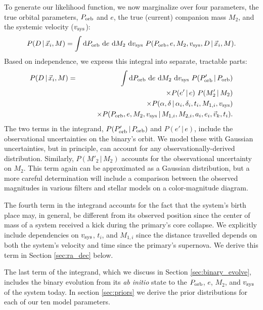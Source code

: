 \documentclass[12pt, preprint]{aastex}
\newcommand{\given}{\,|\,}
\newcommand{\dd}{\mathrm{d}}
\begin{document}
To generate our likelihood function, we now marginalize over four parameters, the true orbital parameters, $P_{\rm orb}$ and $e$, the true (current) companion mass $M_2$, and the systemic velocity ($v_{\rm sys}$):
\begin{equation}
P(D \given \vec{x}_i, M) =  \int \dd P_{\rm orb}\ \dd e\ \dd M_2\ \dd v_{\rm sys}\ P( P_{\rm orb}, e, M_2, v_{\rm sys}, D \given \vec{x}_i, M).
\end{equation}
Based on independence, we express this integral into separate, tractable parts:
\begin{eqnarray}
P(D \given \vec{x}_i, M) &=&  \int \dd P_{\rm orb}\ \dd e\ \dd M_2\ \dd v_{\rm sys}\ P(P'_{\rm orb} \given P_{\rm orb}) \nonumber \\
	& & \qquad \times P(e' \given e)\ P(M'_2 \given M_2) \nonumber \\
	& & \qquad \times P(\alpha, \delta \given \alpha_i, \delta_i, t_i, M_{1,i}, v_{\rm sys}) \nonumber \\
	& & \qquad \times P(P_{\rm orb}, e, M_2, v_{\rm sys} \given M_{1,i}, M_{2,i}, a_i, e_i, \vec{v}_k, t_i). \label{eq:marginalized}
\end{eqnarray}
The two terms in the integrand, $P(P'_{\rm orb} \given P_{\rm orb})$ and $P(e' \given e)$, include the observational uncertainties on the binary's orbit. We model these with Gaussian uncertainties, but in principle, can account for any observationally-derived distribution. Similarly, $P(M'_2 \given M_2)$ accounts for the observational uncertainty on $M_2$. This term again can be approximated as a Gaussian distribution, but a more careful determination will include a comparison between the observed magnitudes in various filters and stellar models on a color-magnitude diagram. 

The fourth term in the integrand accounts for the fact that the system's birth place may, in general, be different from its observed position since the center of mass of a system received a kick during the primary's core collapse. We explicitly include dependencies on $v_{\rm sys}$, $t_i$, and $M_{1,i}$ since the distance travelled depends on both the system's velocity and time since the primary's supernova. We derive this term in Section \ref{sec:ra_dec} below. 

The last term of the integrand, which we discuss in Section \ref{sec:binary_evolve}, includes the binary evolution from its {\it ab initio} state to the $P_{\rm orb}$, $e$, $M_2$, and $v_{\rm sys}$ of the system today. In section \ref{sec:priors} we derive the prior distributions for each of our ten model parameters.
\end{document}
